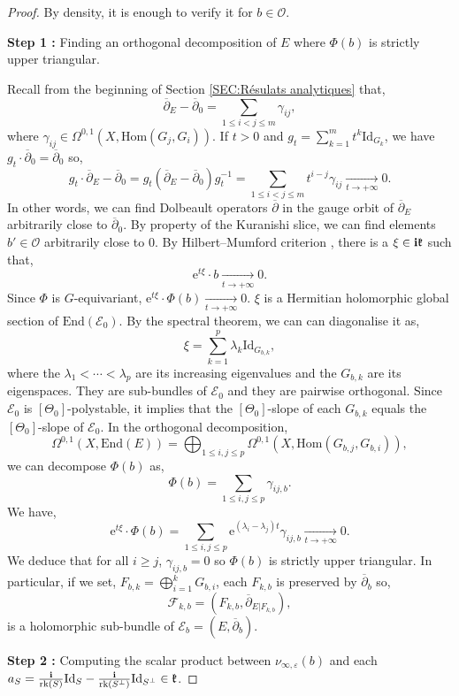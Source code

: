\documentclass{article}
\theoremstyle{remark}
\theoremstyle{definition}
\newcommand{\tend}[2]{\underset{#1 \rightarrow #2}{\longrightarrow}}
\newcommand{\rk}{\mathrm{rk}}
\newcommand{\Hom}{\mathrm{Hom}}
\newcommand{\End}{\mathrm{End}}
\newcommand{\Id}{\mathrm{Id}}
\renewcommand{\i}{\boldsymbol{\mathrm{i}}}
\newcommand{\e}{\boldsymbol{\mathrm{e}}}
\newcommand{\E}{\mathcal{E}}
\newcommand{\F}{\mathcal{F}}
\newcommand{\dbar}{\overline{\partial}}
\renewcommand{\leq}{\leqslant}
\renewcommand{\geq}{\geqslant}
\begin{document}
\begin{proof}
By density, it is enough to verify it for $b \in \mathcal{O}$.

\vspace{1mm}
\noindent\textbf{Step 1 :} Finding an orthogonal decomposition of $E$ where $\Phi(b)$ is strictly upper triangular.
\vspace{1mm}

Recall from the beginning of Section \ref{SEC:Résulats analytiques} that,
$$
\dbar_E - \dbar_0 = \sum_{1 \leq i < j \leq m} \gamma_{ij},
$$
where $\gamma_{ij} \in \Omega^{0,1}(X,\Hom(G_j,G_i))$. If $t > 0$ and $g_t = \sum_{k = 1}^m t^k\Id_{G_k}$, we have $g_t \cdot \dbar_0 = \dbar_0$ so,
$$
g_t \cdot \dbar_E - \dbar_0 = g_t(\dbar_E - \dbar_0)g_t^{-1} = \sum_{1 \leq i < j \leq m} t^{i - j}\gamma_{ij} \tend{t}{+\infty} 0.
$$
In other words, we can find Dolbeault operators $\dbar$ in the gauge orbit of $\dbar_E$ arbitrarily close to $\dbar_0$. By property of the Kuranishi slice, we can find elements $b' \in \mathcal{O}$ arbitrarily close to $0$. By Hilbert--Mumford criterion \cite[Theorem 12.4]{GRS}, there is a $\xi \in \i\frak{k}$ such that,
$$
\e^{t\xi} \cdot b \tend{t}{+\infty} 0.
$$
Since $\Phi$ is $G$-equivariant, $\e^{t\xi} \cdot \Phi(b) \tend{t}{+\infty} 0$. $\xi$ is a Hermitian holomorphic global section of $\End(\E_0)$. By the spectral theorem, we can can diagonalise it as,
$$
\xi = \sum_{k = 1}^p \lambda_k\Id_{G_{b,k}},
$$
where the $\lambda_1 < \cdots < \lambda_p$ are its increasing eigenvalues and the $G_{b,k}$ are its eigenspaces. They are sub-bundles of $\E_0$ and they are pairwise orthogonal. Since $\E_0$ is $[\Theta_0]$-polystable, it implies that the $[\Theta_0]$-slope of each $G_{b,k}$ equals the $[\Theta_0]$-slope of $\E_0$. In the orthogonal decomposition,
$$
\Omega^{0,1}(X,\End(E)) = \bigoplus_{1 \leq i,j \leq p} \Omega^{0,1}(X,\Hom(G_{b,j},G_{b,i})),
$$
we can decompose $\Phi(b)$ as,
$$
\Phi(b) = \sum_{1 \leq i,j \leq p} \gamma_{ij,b}.
$$
We have,
$$
\e^{t\xi} \cdot \Phi(b) = \sum_{1 \leq i,j \leq p} \e^{(\lambda_i - \lambda_j)t}\gamma_{ij,b} \tend{t}{+\infty} 0.
$$
We deduce that for all $i \geq j$, $\gamma_{ij,b} = 0$ so $\Phi(b)$ is strictly upper triangular. In particular, if we set, $F_{b,k} = \bigoplus_{i = 1}^k G_{b,i}$, each $F_{k,b}$ is preserved by $\dbar_b$ so,
$$
\F_{k,b} = (F_{k,b},\dbar_{E|F_{k,b}}),
$$
is a holomorphic sub-bundle of $\E_b = (E,\dbar_b)$.

\vspace{1mm}
\noindent\textbf{Step 2 :} Computing the scalar product between $\nu_{\infty,\varepsilon}(b)$ and each $a_S = \frac{\i}{\rk(S)}\Id_S - \frac{\i}{\rk(S^\bot)}\Id_{S^\bot} \in \frak{k}$.
\vspace{1mm}


\end{proof}
\end{document}
